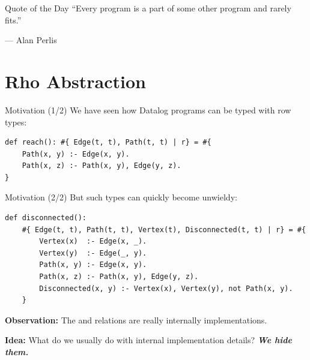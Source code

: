 \begin{frame}{Quote of the Day}
``Every program is a part of some other program and rarely fits.''

\begin{flushright}
--- Alan Perlis
\end{flushright}
\end{frame}



\section{Rho Abstraction}

\begin{frame}[fragile]{Motivation (1/2)}
We have seen how Datalog programs can be typed with row types:
%
\begin{lstlisting}[language=flix, xleftmargin=0.8cm]
def reach(): #{ Edge(t, t), Path(t, t) | r} = #{
    Path(x, y) :- Edge(x, y).
    Path(x, z) :- Path(x, y), Edge(y, z).
}
\end{lstlisting}
\end{frame}

\begin{frame}[fragile]{Motivation (2/2)}
But such types can quickly become unwieldy:
%
\begin{lstlisting}[language=flix, xleftmargin=0.8cm]
def disconnected(): 
    #{ Edge(t, t), Path(t, t), Vertex(t), Disconnected(t, t) | r} = #{
        Vertex(x)  :- Edge(x, _).
        Vertex(y)  :- Edge(_, y).
        Path(x, y) :- Edge(x, y).
        Path(x, z) :- Path(x, y), Edge(y, z).
        Disconnected(x, y) :- Vertex(x), Vertex(y), not Path(x, y).
    }
\end{lstlisting}

\pause

\textbf{Observation:} The  and  relations are really
internally implementations.

\pause

\textbf{Idea:} What do we usually do with internal implementation details? \textbf{\emph{We hide them.}}
\end{frame}

